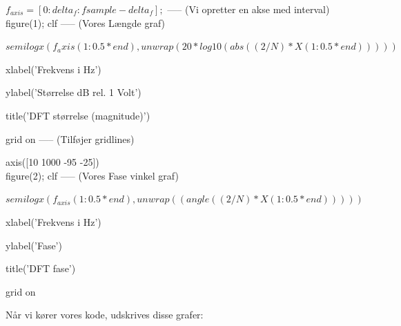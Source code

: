\documentclass[12pt, letterpaper]{article}
\begin{document}
$f_{axis} = [0:delta_f:fsample-delta_f];$ ----- (Vi opretter en akse med interval)\\

figure(1); clf  ----- (Vores Længde graf)  
     
$semilogx(f_axis(1:0.5*end), unwrap(20*log10(abs((2/N)*X(1:0.5*end)))))$

xlabel('Frekvens i Hz')

ylabel('Størrelse dB rel. 1 Volt') 

title('DFT størrelse (magnitude)')

grid on       -----   (Tilføjer gridlines) 
  
axis([10 1000 -95 -25])\\

figure(2); clf 		-----  (Vores Fase vinkel graf)  
                   
$semilogx(f_{axis}(1:0.5*end), unwrap((angle((2/N)*X(1:0.5*end)))))$

xlabel('Frekvens i Hz')

ylabel('Fase')

title('DFT fase')

grid on
\newpage

Når vi kører vores kode, udskrives disse grafer: 
\end{document}
